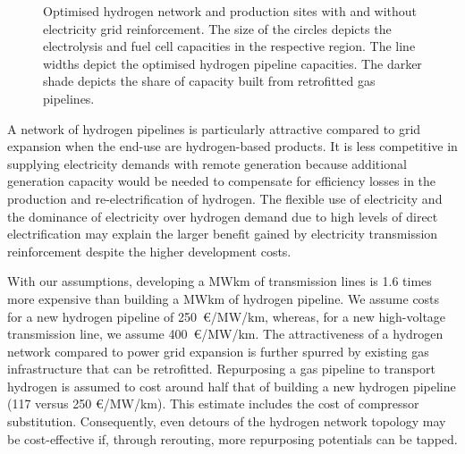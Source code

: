 \begin{figure}
    \centering
     \caption{Optimised hydrogen network and production sites with and without
    electricity grid reinforcement. The size of the circles depicts the
    electrolysis and fuel cell capacities in the respective region. The line
    widths depict the optimised hydrogen pipeline capacities. The darker shade
    depicts the share of capacity built from retrofitted gas pipelines.}
    \label{fig:h2-network}
\end{figure}


A network of hydrogen pipelines is particularly attractive compared to grid
expansion when the end-use are hydrogen-based products. It is less competitive
in supplying electricity demands with remote generation because additional
generation capacity would be needed to compensate for efficiency losses in the
production and re-electrification of hydrogen. The flexible use of electricity
and the dominance of electricity over hydrogen demand due to high levels of
direct electrification may explain the larger benefit gained by electricity
transmission reinforcement despite the higher development costs.


With our assumptions, developing a MWkm of transmission lines is 1.6 times more
expensive than building a MWkm of hydrogen pipeline. We assume costs for a new
hydrogen pipeline of 250~\euro/MW/km, whereas, for a new high-voltage
transmission line, we assume 400~\euro/MW/km. The attractiveness of a hydrogen
network compared to power grid expansion is further spurred by existing gas
infrastructure that can be retrofitted. Repurposing a gas pipeline to transport
hydrogen is assumed to cost around half that of building a new hydrogen pipeline
(117 versus 250 \euro/MW/km). This estimate includes the cost of compressor
substitution. Consequently, even detours of the hydrogen network topology may be
cost-effective if, through rerouting, more repurposing potentials can be tapped.

